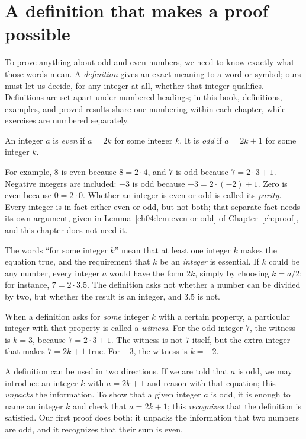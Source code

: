 \section{A definition that makes a proof possible}\label{ch01:sec:definition}
To prove anything about odd and even numbers, we need to know exactly what those words mean. A \emph{definition} gives an exact meaning to a word or symbol; ours must let us decide, for any integer at all, whether that integer qualifies. Definitions are set apart under numbered headings; in this book, definitions, examples, and proved results share one numbering within each chapter, while exercises are numbered separately.
\par\noindent\begin{minipage}{\linewidth}
\begin{definition}\label{def:parity}
An integer $a$ is \emph{even} if $a=2k$ for some integer $k$. It is \emph{odd} if $a=2k+1$ for some integer $k$.
\end{definition}
\end{minipage}\par

For example, $8$ is even because $8=2\cdot4$, and $7$ is odd because $7=2\cdot3+1$. Negative integers are included: $-3$ is odd because $-3=2\cdot(-2)+1$. Zero is even because $0=2\cdot0$. Whether an integer is even or odd is called its \emph{parity}. Every integer is in fact either even or odd, but not both; that separate fact needs its own argument, given in Lemma~\ref{ch04:lem:even-or-odd} of Chapter~\ref{ch:proof}, and this chapter does not need it.

The words ``for some integer $k$'' mean that at least one integer $k$ makes the equation true, and the requirement that $k$ be an \emph{integer} is essential. If $k$ could be any number, every integer $a$ would have the form $2k$, simply by choosing $k=a/2$; for instance, $7=2\cdot3.5$. The definition asks not whether a number can be divided by two, but whether the result is an integer, and $3.5$ is not.

When a definition asks for \emph{some} integer $k$ with a certain property, a particular integer with that property is called a \emph{witness}. For the odd integer $7$, the witness is $k=3$, because $7=2\cdot3+1$. The witness is not $7$ itself, but the extra integer that makes $7=2k+1$ true. For $-3$, the witness is $k=-2$.

A definition can be used in two directions. If we are told that $a$ is odd, we may introduce an integer $k$ with $a=2k+1$ and reason with that equation; this \emph{unpacks} the information. To show that a given integer $a$ is odd, it is enough to name an integer $k$ and check that $a=2k+1$; this \emph{recognizes} that the definition is satisfied. Our first proof does both: it unpacks the information that two numbers are odd, and it recognizes that their sum is even.
